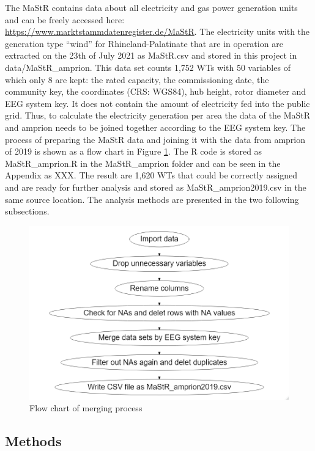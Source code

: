 \documentclass[a4paper,11pt]{article}
\begin{document}
The MaStR contains data about all electricity and gas power generation units and can be freely accessed here: \href{https://www.marktstammdatenregister.de/MaStR/Einheit/Einheiten/OeffentlicheEinheitenuebersicht}{https://www.marktstammdatenregister.de/MaStR}. The electricity units with the generation type ``wind'' for Rhineland-Palatinate that are in operation are extracted on the 23th of July 2021 as MaStR.csv and stored in this project in data/MaStR\_amprion. This data set counts 1,752 WTs with 50 variables of which only 8 are kept: the rated capacity, the commissioning date, the community key, the coordinates (CRS: WGS84), hub height, rotor diameter and EEG system key. It does not contain the amount of electricity fed into the public grid. Thus, to calculate the electricity generation per area the data of the MaStR and amprion needs to be joined together according to the EEG system key. The process of preparing the MaStR data and joining it with the data from amprion of 2019 is shown as a flow chart in Figure \ref{fig:merge}. The R code is stored as MaStR\_amprion.R in the MaStR\_amprion folder and can be seen in the Appendix as XXX. The result are 1,620 WTs that could be correctly assigned and are ready for further analysis and stored as MaStR\_amprion2019.csv in the same source location. The analysis methods are presented in the two following subsections.
\begin{figure}

{\centering \includegraphics[width=0.8\linewidth]{data/MaStR_amprion_join/mergeflow} 

}

\caption{Flow chart of merging process}\label{fig:merge}
\end{figure}
\hypertarget{methods}{%
\subsection{Methods}\label{methods}}
\end{document}
